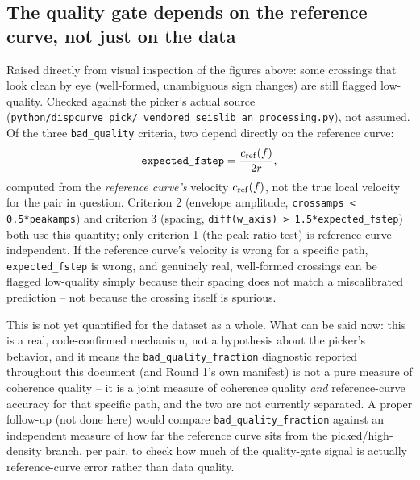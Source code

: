 \documentclass[11pt]{article}
\begin{document}
\subsection{The quality gate depends on the reference curve, not just on the data}
\label{sec:refcurve-dependence}

Raised directly from visual inspection of the figures above: some crossings that look clean by
eye (well-formed, unambiguous sign changes) are still flagged low-quality. Checked against the
picker's actual source
(\texttt{python/dispcurve\_pick/\_vendored\_seislib\_an\_processing.py}), not assumed. Of the
three \texttt{bad\_quality} criteria, two depend directly on the reference curve:
\begin{equation}
  \texttt{expected\_fstep} = \frac{c_{\rm ref}(f)}{2r},
\end{equation}
computed from the \emph{reference curve's} velocity $c_{\rm ref}(f)$, not the true local velocity
for the pair in question. Criterion 2 (envelope amplitude, \texttt{crossamps < 0.5*peakamps}) and
criterion 3 (spacing, \texttt{diff(w\_axis) > 1.5*expected\_fstep}) both use this quantity; only
criterion 1 (the peak-ratio test) is reference-curve-independent. If the reference curve's
velocity is wrong for a specific path, \texttt{expected\_fstep} is wrong, and genuinely real,
well-formed crossings can be flagged low-quality simply because their spacing does not match a
miscalibrated prediction -- not because the crossing itself is spurious.

This is not yet quantified for the dataset as a whole. What can be said now: this is a real,
code-confirmed mechanism, not a hypothesis about the picker's behavior, and it means the
\texttt{bad\_quality\_fraction} diagnostic reported throughout this document (and Round 1's own
manifest) is not a pure measure of coherence quality -- it is a joint measure of coherence
quality \emph{and} reference-curve accuracy for that specific path, and the two are not currently
separated. A proper follow-up (not done here) would compare \texttt{bad\_quality\_fraction}
against an independent measure of how far the reference curve sits from the picked/high-density
branch, per pair, to check how much of the quality-gate signal is actually reference-curve error
rather than data quality.
\end{document}
